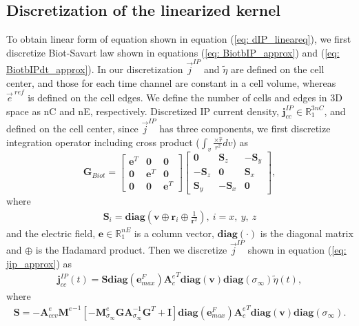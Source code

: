 \documentclass[a4paper, 11pt]{article}
\newcommand{\siginf}{\sigma_\infty}
\newcommand{\Ace}{{\mathbf A_c^e}}
\newcommand{\diag}{\mathbf{diag}}
\newcommand{\M}{{\mathbf M}}
\newcommand{\MeSigInf}{{\M^e_{\sigma_\infty}}}
\newcommand{\Me}{{\M^e}}
\renewcommand {\j}  { {\vec j} }
\newcommand {\e}  { {\vec e} }
\renewcommand {\dj}  { {\mathbf{j} } }
\newcommand {\de}  { {\mathbf{e} } }
\newcommand{\vol}{\mathbf{v}}
\newcommand{\A}{\mathbf{A}}
\newcommand{\peta}{\tilde{\eta}}
\newcommand{\eref}{\e^{\ ref}}
\begin{document}
\subsection{Discretization of the linearized kernel}
\label{section:linearkernel_discrete}
To obtain linear form of equation shown in equation (\ref{eq: dIP_lineareq}),
we first discretize Biot-Savart law shown in equations (\ref{eq: BiotbIP_approx}) and (\ref{eq: BiotbIPdt_approx}). In our discretization $\j^{IP}$ and  $\peta$ are defined on the cell center, and those for each time channel are constant in a cell volume, whereas $\eref$ is defined on the cell edges. 
We define the number of cells and edges in 3D space as nC and nE, respectively. Discretized IP current density, $\dj^{IP}_{cc} \in \mathbb{R}^{3nC}_{1}$, and defined on the cell center, since $\j^{IP}$ has three components, we first discretize integration operator including cross product ($\int_{v}\frac{ \times \hat{r}}{r^2}dv$) as
\begin{equation}
  \mathbf{G}_{Biot} =
  \begin{bmatrix}
       \mathbf{e}^T &  \mathbf{0}   & \mathbf{0}  \\
       \mathbf{0}   &  \mathbf{e}^T & \mathbf{0}  \\
       \mathbf{0}   &  \mathbf{0}   & \mathbf{e}^T
    \end{bmatrix}
  \begin{bmatrix}
       \mathbf{0}     &   \mathbf{S}_z   & -\mathbf{S}_y  \\
      -\mathbf{S}_z   &   \mathbf{0}     &  \mathbf{S}_x  \\
       \mathbf{S}_y   &  -\mathbf{S}_x   &  \mathbf{0}
    \end{bmatrix},
 \end{equation}
where
\begin{eqnarray*}
  \mathbf{S}_i =\diag(\mathbf{v}\oplus \mathbf{r}_i \oplus \frac{1}{\mathbf{r}^2}), \ i = x, \ y, \ z
\end{eqnarray*}
and the electric field, $\mathbf{e} \in \mathbb{R}^{nE}_1$ is a column vector, $\diag(\cdot)$ is the diagonal matrix and $\oplus$ is the Hadamard product. 
Then we discretize $\j^{IP}$ shown in equation (\ref{eq: jip_approx}) as
\begin{eqnarray}
  \dj^{IP}_{cc}(t) = \mathbf{S}\diag(\de^{F}_{max})\Ace^T\diag(\vol)\diag(\siginf)\peta(t),
\end{eqnarray}
where
\begin{eqnarray}
  \mathbf{S} = -\mathbf{A}^{e}_{ccv}\Me^{-1}[-\MeSigInf \mathbf{G} \A_{\siginf}^{-1}\mathbf{G}^T + \mathbf{I}] \diag(\de^{F}_{max})\Ace^T\diag(\vol)\diag(\siginf).
\end{eqnarray}
\end{document}
